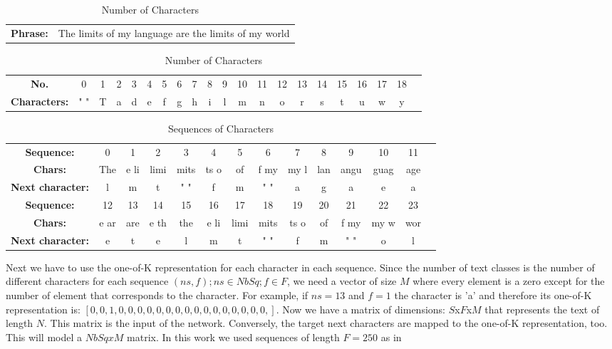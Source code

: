 \begin{table}{}

\begin{tabular}{c c}
\textbf{Phrase: }&The limits of my language are the limits of my world \\
\end{tabular}
\begin{tabular}{c c c c c c c c c c c c c c c c c c c c c}
\textbf{No.}&0&1&2&3&4&5&6&7&8&9&10&11&12&13&14&15&16&17&18\\
\textbf{Characters:}& " "& T& a& d& e& f& g& h& i& l& m& n& o& r& s& t& u& w& y\\
\end{tabular}
\caption{Number of Characters}
\end{table}
\begin{table}{}
\begin{tabular}{c c c c c c c c c c c c c c}
\textbf{Sequence:} &0&1&2 & 3 &4&5&6&7&8&9&10&11\\
\textbf{Chars:} &The &e li&limi&mits&ts o& of &f my&my l& lan&angu&guag&age\\ 
\textbf{Next character: }&l&m&t&" "&f&m&" "&a&g&a&e&a\\
\textbf{Sequence:} &12&13&14&15&16&17&18&19&20&21&22&23\\
\textbf{Chars:} &e ar&are &e th&the &e li&limi&mits&ts o& of &f my&my w& wor\\
\textbf{Next character: }&e&t&e&l&m&t&" "&f&m&" "&o&l\\
\end{tabular}

\caption{Sequences of Characters}
\label{tab:seqch}

\end{table}


Next we have to use the one-of-K representation for each character in each sequence. Since the number of text classes is the number of different characters for each sequence $(ns,f);  ns \in NbSq; f \in F $, we need a vector of size $M$ where every element is a zero except for the number of element that corresponds to the character. For example, if $ns=13$ and $f=1$ the character is 'a' and therefore its one-of-K representation is: $[0,0,1,0,0,0,0,0,0,0,0,0,0,0,0,0,0,0,0,]$. 
Now we have a matrix of dimensions: $S$x$F$x$M$ that represents the text of length $N$. This matrix is the input of the network. Conversely, the target next characters are mapped to the one-of-K representation, too. This will model a $NbSq x M$ matrix. 
In this work we used sequences of length $F=250$ as in \cite{sutskever2011generating}

